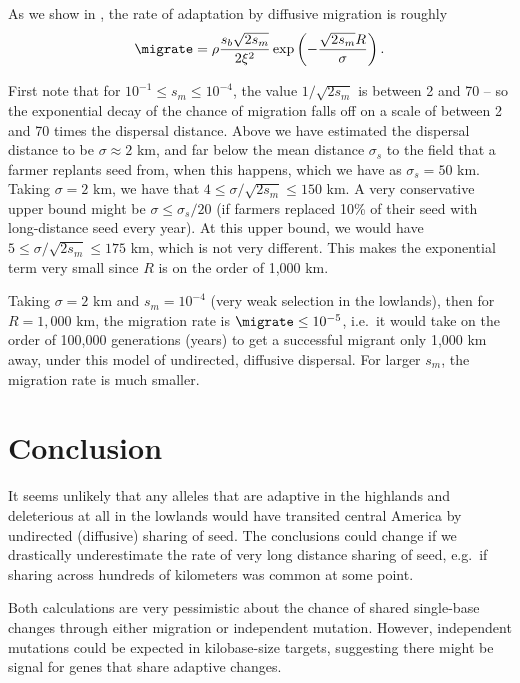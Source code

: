 As we show in  , 
the rate of adaptation by diffusive migration is roughly
\begin{align*}
  \migrate = \rho \frac{s_b \sqrt{2 s_m}}{2\xi^2} \exp\left(- \frac{\sqrt{2 s_m}R}{\sigma} \right) .
\end{align*}


First note that for $10^{-1} \le s_m \le 10^{-4}$, the value $1/\sqrt{2s_m}$ is between 2 and 70 --
so the exponential decay of the chance of migration falls off on a scale of between 2 and 70 times the dispersal distance.
Above we have estimated the dispersal distance to be $\sigma \approx 2$ km,
and far below the mean distance $\sigma_s$ to the field that a farmer replants seed from, when this happens,
which we have as $\sigma_s = 50$ km.
Taking $\sigma=2$ km, we have that $4 \le \sigma/\sqrt{2s_m} \le 150$ km.
A very conservative upper bound might be $\sigma \le \sigma_s/20$ (if farmers replaced 10\% of their seed with long-distance seed every year).
At this upper bound, we would have $5 \le \sigma/\sqrt{2s_m} \le 175$ km,
which is not very different.
This makes the exponential term very small since $R$ is on the order of 1,000 km.

Taking $\sigma=2$ km
and $s_m = 10^{-4}$ (very weak selection in the lowlands), then for $R=1,000$ km, the migration rate is $\migrate \le 10^{-5}$,
i.e.\ it would take on the order of 100,000 generations (years) to get a successful migrant only 1,000 km away,
under this model of undirected, diffusive dispersal.
For larger $s_m$, the migration rate is much smaller.

\section{Conclusion}

It seems unlikely that any alleles that are adaptive in the highlands and deleterious at all in the lowlands
would have transited central America by undirected (diffusive) sharing of seed.
The conclusions could change if we drastically underestimate the rate of very long distance sharing of seed,
e.g.\ if sharing across hundreds of kilometers was common at some point.

Both calculations are very pessimistic about the chance of shared single-base changes through either migration or independent mutation.
However, independent mutations could be expected in kilobase-size targets,
suggesting there might be signal for genes that share adaptive changes.


